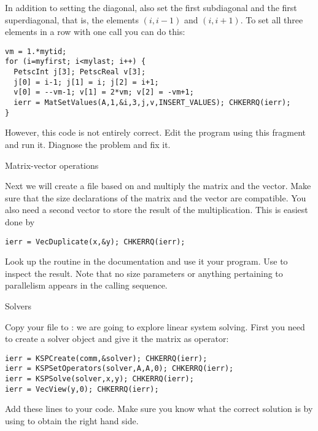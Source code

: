 \begin{exercise}
  In addition to setting the diagonal, also set the first
  subdiagonal and the first superdiagonal, that is, the elements
  $(i,i-1)$ and $(i,i+1)$. To set all three elements in a row with one
  call you can do this:
\begin{verbatim}
vm = 1.*mytid;
for (i=myfirst; i<mylast; i++) {
  PetscInt j[3]; PetscReal v[3];
  j[0] = i-1; j[1] = i; j[2] = i+1;
  v[0] = --vm-1; v[1] = 2*vm; v[2] = -vm+1;
  ierr = MatSetValues(A,1,&i,3,j,v,INSERT_VALUES); CHKERRQ(ierr);
}
\end{verbatim}
However, this code is not entirely correct. Edit the program using
this fragment and run it. Diagnose the problem and fix it.
\end{exercise}

 {Matrix-vector operations}

Next we will create a file  based on  and multiply the
matrix and the vector. Make sure that the size declarations
of the matrix and the vector are compatible. You also need a second
vector to store the result of the multiplication. This is easiest done
by
\begin{verbatim}
ierr = VecDuplicate(x,&y); CHKERRQ(ierr);
\end{verbatim}

\begin{exercise}
  Look up the  routine in the documentation and use it your
  program. Use  to inspect the result. Note that no size
  parameters or anything pertaining to parallelism appears in the
  calling sequence.
\end{exercise}

 {Solvers}

Copy your  file to : we are going to explore linear
system solving.
First you need to create a solver object and give
it the matrix as operator:
\begin{verbatim}
ierr = KSPCreate(comm,&solver); CHKERRQ(ierr);
ierr = KSPSetOperators(solver,A,A,0); CHKERRQ(ierr);
ierr = KSPSolve(solver,x,y); CHKERRQ(ierr);
ierr = VecView(y,0); CHKERRQ(ierr);
\end{verbatim}

\begin{exercise}
  Add these lines to your code. Make sure you know what the correct
  solution is by using  to obtain the right hand side.
\end{exercise}

